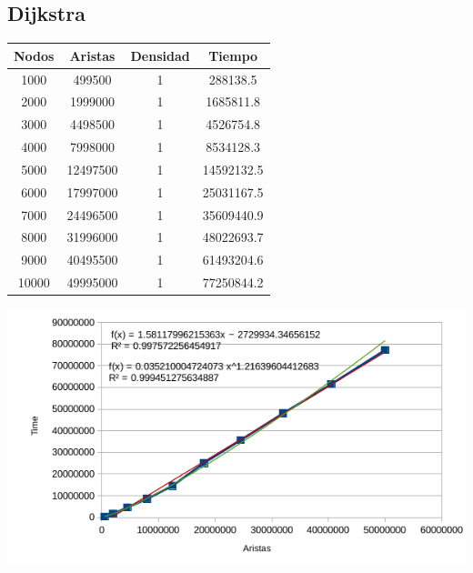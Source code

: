 \documentclass[letterpaper,11pt]{article}
\begin{document}
        \subsection{Dijkstra}
            \begin{table}[h]
                \centering
                \begin{tabular}{|c|c|c|c|}
                \hline
                Nodos  & Aristas  & Densidad & Tiempo     \\ \hline
                1000   & 499500   & 1        & 288138.5   \\ \hline
                2000   & 1999000  & 1        & 1685811.8  \\ \hline
                3000   & 4498500  & 1        & 4526754.8  \\ \hline
                4000   & 7998000  & 1        & 8534128.3  \\ \hline
                5000   & 12497500 & 1        & 14592132.5 \\ \hline
                6000   & 17997000 & 1        & 25031167.5 \\ \hline
                7000   & 24496500 & 1        & 35609440.9 \\ \hline
                8000   & 31996000 & 1        & 48022693.7 \\ \hline
                9000   & 40495500 & 1        & 61493204.6 \\ \hline
                10000  & 49995000 & 1        & 77250844.2 \\ \hline
                \end{tabular}
                \includegraphics[scale=0.8]{dijkstraPlot.png}
            \end{table}
\end{document}
